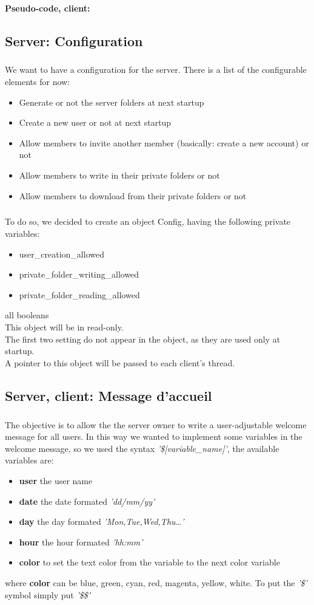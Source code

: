 \documentclass[12pt,a4paper,twoside]{article}
\begin{document}
			\paragraph*{Pseudo-code, client:}
				
		\subsection{Server: Configuration} %
			\subparagraph*{}
				We want to have a configuration for the server. There is a list of the configurable elements for now:
				\begin{itemize}
					\item{} Generate or not the server folders at next startup
					\item{} Create a new user or not at next startup
					\item{} Allow members to invite another member (basically: create a new account) or not
					\item{} Allow members to write in their private folders or not
					\item{} Allow members to download from their private folders or not
				\end{itemize}
			\subparagraph*{}
				To do so, we decided to create an object Config, having the following private variables:
				\begin{itemize}
					\item{} user\_creation\_allowed
					\item{} private\_folder\_writing\_allowed
					\item{} private\_folder\_reading\_allowed
				\end{itemize}
				all booleans\\
				This object will be in read-only.\\
				The first two setting do not appear in the object, as they are used only at startup.\\
				A pointer to this object will be passed to each client's thread.
		\subsection{Server, client: Message d'accueil} %
			\subparagraph*{}
				The objective is to allow the the server owner to write a user-adjustable welcome message for all users.
				In this way we wanted to implement some variables in the welcome message, so we used the syntax \textit{'\$[variable\_name]'}, the available variables are:
				\begin{itemize}
					\item{} \textbf{user} the user name
					\item{} \textbf{date} the date formated \textit{'dd/mm/yy'}
					\item{} \textbf{day} the day formated \textit{'Mon,Tue,Wed,Thu\ldots'}
					\item{} \textbf{hour} the hour formated \textit{'hh:mm'}
					\item{} \textbf{color} to set the text color from the variable to the next color variable
				\end{itemize}
				where \textbf{color} can be blue, green, cyan, red, magenta, yellow, white.
				To put the \textit{'\$'} symbol simply put \textit{'\$\$'}
\end{document}
